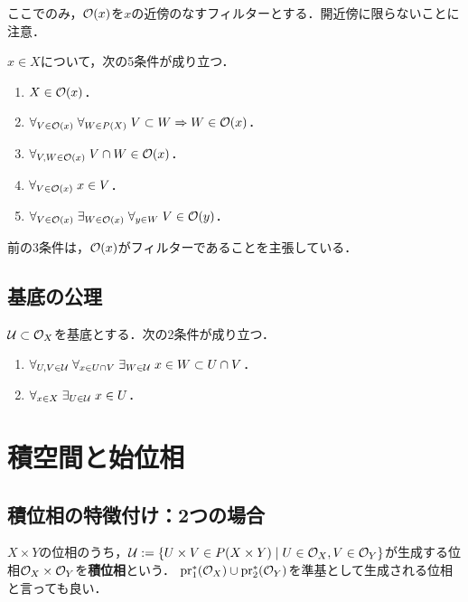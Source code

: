 \documentclass[uplatex,dvipdfmx]{jsreport}
\begin{document}
\begin{notation}
    ここでのみ，$\mathcal{O}(x)$を$x$の近傍のなすフィルターとする．開近傍に限らないことに注意．
\end{notation}

\begin{proposition}
    $x\in X$について，次の5条件が成り立つ．
    \begin{enumerate}
        \item $X\in\mathcal{O}(x)$．
        \item $\forall_{V\in\mathcal{O}(x)}\;\forall_{W\in P(X)}\;V\subset W\Rightarrow W\in\mathcal{O}(x)$．
        \item $\forall_{V,W\in\mathcal{O}(x)}\;V\cap W\in\mathcal{O}(x)$．
        \item $\forall_{V\in\mathcal{O}(x)}\;x\in V$．
        \item $\forall_{V\in\mathcal{O}(x)}\;\exists_{W\in\mathcal{O}(x)}\;\forall_{y\in W}\;V\in\mathcal{O}(y)$．
    \end{enumerate}
    前の3条件は，$\mathcal{O}(x)$がフィルターであることを主張している．
\end{proposition}

\subsection{基底の公理}

\begin{proposition}
    $\mathcal{U}\subset\mathcal{O}_X$を基底とする．次の2条件が成り立つ．
    \begin{enumerate}
        \item $\forall_{U,V\in\mathcal{U}}\;\forall_{x\in U\cap V}\;\exists_{W\in\mathcal{U}}\;x\in W\subset U\cap V$．
        \item $\forall_{x\in X}\;\exists_{U\in\mathcal{U}}\;x\in U$．
    \end{enumerate}
\end{proposition}

\section{積空間と始位相}

\subsection{積位相の特徴付け：2つの場合}

\begin{definition}
    $X\times Y$の位相のうち，$\mathcal{U}:=\left\{U\times V\in P(X\times Y)\mid U\in\mathcal{O}_X,V\in\mathcal{O}_Y\right\}$が生成する位相$\mathcal{O}_X\times\mathcal{O}_Y$を\textbf{積位相}という．
    $\mathrm{pr}_1^*(\mathcal{O}_X)\cup\mathrm{pr}_2^*(\mathcal{O}_Y)$を準基として生成される位相と言っても良い．
\end{definition}
\end{document}

